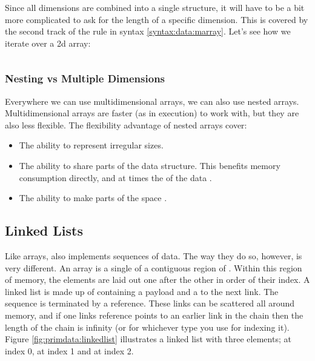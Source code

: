 \begin{syntaxfloat}
  
  \caption{Multidimensional arrays}
  \label{syntax:data:marray}
\end{syntaxfloat}

Since all dimensions are combined into a single structure, it will have to be a bit more complicated to ask for the length of a specific dimension. This is covered by the second track of the  rule in syntax \ref{syntax:data:marray}. Let's see how we iterate over a 2d array:

\inputminted[]{csharp}{../src/csharp/primdata/marray/Program.cs}

\subsubsection{Nesting vs Multiple Dimensions}

Everywhere we can use multidimensional arrays, we can also use nested arrays. Multidimensional arrays are faster (as in execution) to work with, but they are also less flexible. The flexibility advantage of nested arrays cover:
\begin{itemize}
  \item The ability to represent irregular sizes.
  \item The ability to share parts of the data structure. This benefits memory consumption directly, and at times the  of the data .
  \item The ability to make parts of the space .
\end{itemize}

\subsection{Linked Lists}
\label{sec:primdata:sequence:list}

Like arrays,  also implements sequences of data. The way they do so, however, is very different. An array is a single  of a contiguous region of . Within this region of memory, the elements are laid out one after the other in order of their index. A linked list is made up of  containing a payload and a  to the next link. The sequence is terminated by a  reference. These links can be scattered all around memory, and if one links reference points to an earlier link in the chain then the length of the chain is infinity (or  for whichever type you use for indexing it). Figure \ref{fig:primdata:linkedlist} illustrates a linked list with three elements;  at index 0,  at index 1 and  at index 2.

